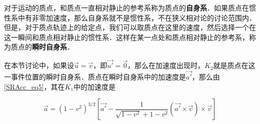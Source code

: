 对于运动的质点，和质点一直相对静止的参考系称为质点的\textbf{自身系}．如果质点在惯性系中有非零加速度，那么自身系就不是惯性系，不在狭义相对论的讨论范围内．但是，对于质点轨迹上的给定点，我们可以取质点在这里的速度，然后选择一个在这一瞬间和质点相对静止的惯性系．这样在某一点处和质点相对静止的参考系，称为质点的\textbf{瞬时自身系}．

在本节讨论中，如果设$\vec{u}=\vec{v}$，即$\vec{u'}=\vec{0}$，那么在加速度出现时，$K_2$就是质点在这一事件位置的瞬时自身系．质点在瞬时自身系中的加速度是$\vec{a'}$，那么由\autoref{SRAcc_eq5}，其在$K_1$中的加速度是

\begin{equation}

\vec{a}=(1-v^2)^{3/2}[\vec{a'}-\frac{1}{\sqrt{1-v^2}+1-v^2}(\vec{a'}\times\vec{v})\times\vec{v}]

\end{equation}


